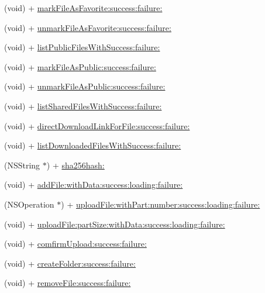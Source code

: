 \begin{DoxyCompactItemize}
\item 
(void) + \hyperlink{interface_w_request_ada3c70d1e92a68a83ea3630c8f7c9964}{mark\-File\-As\-Favorite\-:success\-:failure\-:}
\item 
(void) + \hyperlink{interface_w_request_aeeb9485c55b338bcfa63c603d560ebd7}{unmark\-File\-As\-Favorite\-:success\-:failure\-:}
\item 
(void) + \hyperlink{interface_w_request_a8e72edba383125d0f4817e5d898a9fe2}{list\-Public\-Files\-With\-Success\-:failure\-:}
\item 
(void) + \hyperlink{interface_w_request_a8660b207462f7650c2bbc210f8e4e9fd}{mark\-File\-As\-Public\-:success\-:failure\-:}
\item 
(void) + \hyperlink{interface_w_request_a527a040faf907ad890fe63ff4cdae4c9}{unmark\-File\-As\-Public\-:success\-:failure\-:}
\item 
(void) + \hyperlink{interface_w_request_a0eb75c98cc56c3ad5798a16dc795e0fa}{list\-Shared\-Files\-With\-Success\-:failure\-:}
\item 
(void) + \hyperlink{interface_w_request_aed14621e209bad705b2ebcd4de459593}{direct\-Download\-Link\-For\-File\-:success\-:failure\-:}
\item 
(void) + \hyperlink{interface_w_request_afe6dff273a5604c139814f645485f3f9}{list\-Downloaded\-Files\-With\-Success\-:failure\-:}
\item 
(N\-S\-String $\ast$) + \hyperlink{interface_w_request_a8d50844ae308c8a072c93e7cc90dddf5}{sha256hash\-:}
\item 
(void) + \hyperlink{interface_w_request_aa269c4d286ffed82b8aa6948d5b3faaf}{add\-File\-:with\-Data\-:success\-:loading\-:failure\-:}
\item 
(N\-S\-Operation $\ast$) + \hyperlink{interface_w_request_a4a1398a9ef7ce9afcc3e02cdb85322c9}{upload\-File\-:with\-Part\-:number\-:success\-:loading\-:failure\-:}
\item 
(void) + \hyperlink{interface_w_request_ad103b9a44caafada269a1515488de693}{upload\-File\-:part\-Size\-:with\-Data\-:success\-:loading\-:failure\-:}
\item 
(void) + \hyperlink{interface_w_request_a9ab925f4aa518f084cf36d37795f1b23}{comfirm\-Upload\-:success\-:failure\-:}
\item 
(void) + \hyperlink{interface_w_request_a4ad4daa5d27da579425efb47515cd807}{create\-Folder\-:success\-:failure\-:}
\item 
(void) + \hyperlink{interface_w_request_a84de9f68ca5074a44141f5b8942bd03e}{remove\-File\-:success\-:failure\-:}
\item 

\end{DoxyCompactItemize}

